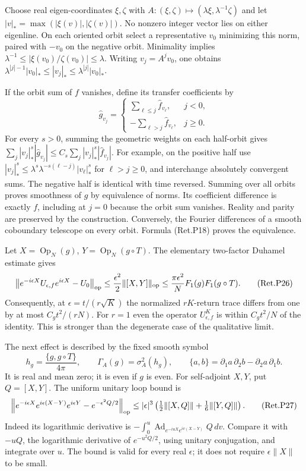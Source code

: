 Choose real eigen-coordinates \(\xi,\zeta\) with
\(A:(\xi,\zeta)\mapsto(\lambda\xi,\lambda^{-1}\zeta)\) and let
\(|v|_*=\max(|\xi(v)|,|\zeta(v)|)\). No nonzero integer vector lies on
either eigenline. On each oriented orbit select a representative \(v_0\)
minimizing this norm, paired with \(-v_0\) on the negative orbit.
Minimality implies
\(\lambda^{-1}\le|\xi(v_0)/\zeta(v_0)|\le\lambda\).
Writing \(v_j=A^jv_0\), one obtains
\(\lambda^{|j|-1}|v_0|_*\le|v_j|_*\le\lambda^{|j|}|v_0|_*\).

If the orbit sum of \(f\) vanishes, define its transfer coefficients by
\[
 \widehat g_{v_j}=
 \begin{cases}
   \sum_{\ell\le j}\widehat f_{v_\ell},&j<0,\\
   -\sum_{\ell>j}\widehat f_{v_\ell},&j\ge0 .
 \end{cases}
\]
For every \(s>0\), summing the geometric weights on each half-orbit gives
\(\sum_j|v_j|_*^s|\widehat g_{v_j}|  \le C_s\sum_j|v_j|_*^s|\widehat f_{v_j}|\).
For example, on the positive half use
\(|v_j|_*^s\le\lambda^s\lambda^{-s(\ell-j)}|v_\ell|_*^s\)
for \(\ell>j\ge0\), and interchange absolutely convergent sums.
The negative half is identical with time reversed.
Summing over all orbits proves smoothness of \(g\) by equivalence of norms.
Its coefficient difference is exactly \(f\), including at \(j=0\) because
the orbit sum vanishes. Reality and parity are preserved by the construction.
Conversely, the Fourier differences of a smooth coboundary telescope
on every orbit. Formula (Ret.P18) proves the equivalence.

Let \(X=\operatorname{Op}_N(g)\), \(Y=\operatorname{Op}_N(g\circ T)\).
The elementary two-factor Duhamel estimate gives
\[
 \left\|e^{-i\epsilon X}U_{\epsilon,f}e^{i\epsilon X}-U_0\right\|_{\rm op}
 \le\frac{\epsilon^2}{2}\|[X,Y]\|_{\rm op}
 \le\frac{\pi\epsilon^2}{N}F_1(g)F_1(g\circ T).              \tag{Ret.P26}
\]
Consequently, at \(\epsilon=t/(r\sqrt K)\) the normalized \(rK\)-return
trace differs from one by at most \(C_g t^2/(rN)\). For \(r=1\) even the
operator \(U_{\epsilon,f}^K\) is within \(C_gt^2/N\) of the identity.
This is stronger than the degenerate case of the qualitative limit.

The next effect is described by the fixed smooth symbol
\[
 h_g=\frac{\{g,g\circ T\}}{4\pi},\qquad
 \Gamma_A(g)=\sigma_A^2(h_g),\qquad
 \{a,b\}=\partial_1a\,\partial_2b-\partial_2a\,\partial_1b .
\]
It is real and mean zero; it is even if \(g\) is even.
For self-adjoint \(X,Y\), put \(Q=[X,Y]\). The uniform unitary loop bound is
\[
 \left\|e^{-i\epsilon X}e^{i\epsilon(X-Y)}e^{i\epsilon Y}
                             -e^{-\epsilon^2Q/2}\right\|_{\rm op}
 \le|\epsilon|^3\left(\tfrac12\|[X,Q]\|
                              +\tfrac16\|[Y,Q]\|\right).   \tag{Ret.P27}
\]
Indeed its logarithmic derivative is
\(-\int_0^u\operatorname{Ad}_{e^{-iuX}e^{iv(X-Y)}}Q\,dv\).
Compare it with \(-uQ\), the logarithmic derivative of
\(e^{-u^2Q/2}\), using unitary conjugation, and integrate over \(u\).
The bound is valid for every real \(\epsilon\); it does not require
\(\epsilon\|X\|\) to be small.

